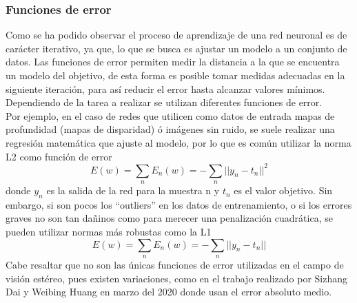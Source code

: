 \subsubsection{Funciones de error}
Como se ha podido observar el proceso de aprendizaje de una red neuronal es de carácter iterativo, ya que, lo que se busca es ajustar un modelo a un conjunto de datos. Las funciones de error permiten medir la distancia a la que se encuentra un modelo del objetivo, de esta forma es posible tomar medidas adecuadas en la siguiente iteración, para así reducir el error hasta alcanzar valores mínimos. Dependiendo de la tarea a realizar se utilizan diferentes funciones de error. 
\\
Por ejemplo, en el caso de redes que utilicen como datos de entrada mapas de profundidad (mapas de disparidad) ó imágenes sin ruido, se suele realizar una regresión matemática que ajuste al modelo, por lo que es común utilizar la norma L2 como función de error
\begin{equation}
    E(w) = \sum_{n} E_{n}(w) = - \sum_{n} ||y_{n} - t_{n}||^{2}
\end{equation}
donde $y_{n}$ es la salida de la red para la muestra n y $t_{n}$ es el valor objetivo. Sin embargo, si son pocos los ``outliers'' en los datos de entrenamiento, o si los errores graves no son tan dañinos como para merecer una penalización cuadrática, se pueden utilizar normas más robustas como la L1
\begin{equation}
    E(w) = \sum_{n} E_{n}(w) = - \sum_{n} ||y_{n} - t_{n}||
\end{equation}
Cabe resaltar que no son las únicas funciones de error utilizadas en el campo de visión estéreo, pues existen variaciones, como en el trabajo realizado por Sizhang Dai y Weibing Huang en marzo del 2020 \cite{dai2020atvsnet} donde usan el error absoluto medio.
